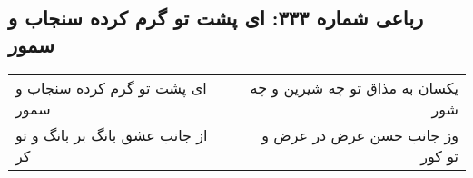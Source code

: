 \begin{center}
\section*{رباعی شماره ۳۳۳: ای پشت تو گرم کرده سنجاب و سمور}
\label{sec:sh333}
\begin{longtable}{l p{0.5cm} r}
ای پشت تو گرم کرده سنجاب و سمور
&&
یکسان به مذاق تو چه شیرین و چه شور
\\
از جانب عشق بانگ بر بانگ و تو کر
&&
وز جانب حسن عرض در عرض و تو کور
\\
\end{longtable}
\end{center}
